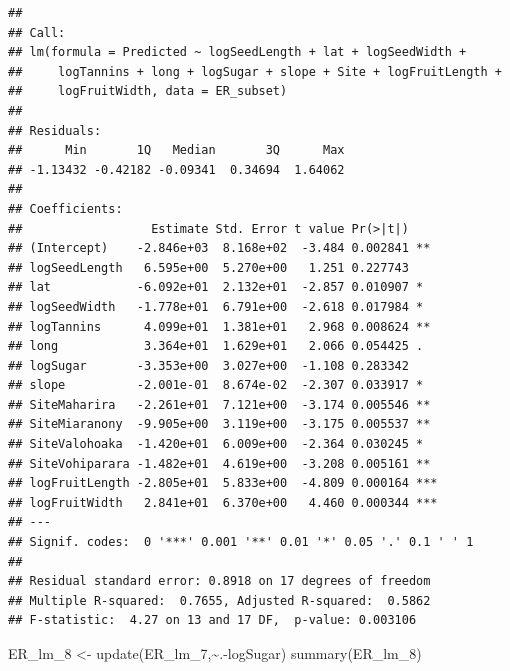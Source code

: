 \documentclass[
  12pt,
]{article}
\newenvironment{Shaded}{\begin{snugshade}}{\end{snugshade}}
\newcommand{\FunctionTok}[1]{\textcolor[rgb]{0.00,0.00,0.00}{#1}}
\newcommand{\NormalTok}[1]{#1}
\newcommand{\OtherTok}[1]{\textcolor[rgb]{0.56,0.35,0.01}{#1}}
\newcommand{\SpecialCharTok}[1]{\textcolor[rgb]{0.00,0.00,0.00}{#1}}
\begin{document}
\begin{verbatim}
## 
## Call:
## lm(formula = Predicted ~ logSeedLength + lat + logSeedWidth + 
##     logTannins + long + logSugar + slope + Site + logFruitLength + 
##     logFruitWidth, data = ER_subset)
## 
## Residuals:
##      Min       1Q   Median       3Q      Max 
## -1.13432 -0.42182 -0.09341  0.34694  1.64062 
## 
## Coefficients:
##                  Estimate Std. Error t value Pr(>|t|)    
## (Intercept)    -2.846e+03  8.168e+02  -3.484 0.002841 ** 
## logSeedLength   6.595e+00  5.270e+00   1.251 0.227743    
## lat            -6.092e+01  2.132e+01  -2.857 0.010907 *  
## logSeedWidth   -1.778e+01  6.791e+00  -2.618 0.017984 *  
## logTannins      4.099e+01  1.381e+01   2.968 0.008624 ** 
## long            3.364e+01  1.629e+01   2.066 0.054425 .  
## logSugar       -3.353e+00  3.027e+00  -1.108 0.283342    
## slope          -2.001e-01  8.674e-02  -2.307 0.033917 *  
## SiteMaharira   -2.261e+01  7.121e+00  -3.174 0.005546 ** 
## SiteMiaranony  -9.905e+00  3.119e+00  -3.175 0.005537 ** 
## SiteValohoaka  -1.420e+01  6.009e+00  -2.364 0.030245 *  
## SiteVohiparara -1.482e+01  4.619e+00  -3.208 0.005161 ** 
## logFruitLength -2.805e+01  5.833e+00  -4.809 0.000164 ***
## logFruitWidth   2.841e+01  6.370e+00   4.460 0.000344 ***
## ---
## Signif. codes:  0 '***' 0.001 '**' 0.01 '*' 0.05 '.' 0.1 ' ' 1
## 
## Residual standard error: 0.8918 on 17 degrees of freedom
## Multiple R-squared:  0.7655, Adjusted R-squared:  0.5862 
## F-statistic:  4.27 on 13 and 17 DF,  p-value: 0.003106
\end{verbatim}

\begin{Shaded}
\begin{Highlighting}[]
\NormalTok{ER\_lm\_8 }\OtherTok{\textless{}{-}} \FunctionTok{update}\NormalTok{(ER\_lm\_7,}\SpecialCharTok{\textasciitilde{}}\NormalTok{.}\SpecialCharTok{{-}}\NormalTok{logSugar)}
\FunctionTok{summary}\NormalTok{(ER\_lm\_8)}
\end{Highlighting}
\end{Shaded}
\end{document}
